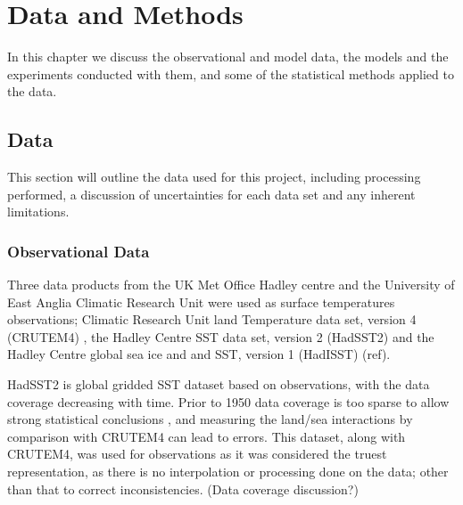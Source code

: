 \chapter{Data and Methods} %

\label{methods} %


In this chapter we discuss the observational and model data, the models and the 
experiments conducted with them, and some of the statistical methods applied to 
the data.


\section{Data}

This section will outline the data used for this project, including processing 
performed, a discussion of uncertainties for each data set and any inherent 
limitations.

\subsection{Observational Data}

Three data products from the UK Met Office Hadley centre and the University of 
East Anglia Climatic Research Unit were used as surface temperatures 
observations; Climatic Research Unit land Temperature data set, version 
4 (CRUTEM4) \citep{Brohan2006}, the Hadley Centre SST data set,
version 2 (HadSST2) \citep{Rayner2006} and the Hadley Centre global sea ice and 
and SST, version 1 (HadISST) (ref).

HadSST2 is global gridded SST dataset based on observations, with the data 
coverage decreasing with time. Prior to 1950 data coverage is too sparse to 
allow strong statistical conclusions \citep{Dommenget2009}, and measuring the 
land/sea interactions by comparison with CRUTEM4 can lead to errors. This 
dataset, along with CRUTEM4, was used for observations as it was considered the 
truest representation, as there is no interpolation or processing done on the 
data; other than that to correct inconsistencies. (Data coverage discussion?)

